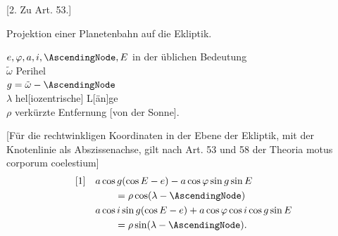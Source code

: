 \begin{center}
[2. Zu Art. 53.]
\medskip

Projektion einer Planetenbahn auf die Ekliptik.
\end{center}
\noindent \(e,\varphi,a,i,\AscendingNode,E\) in der üblichen Bedeutung\\
\(\tilde\omega\) Perihel\\
\(g=\tilde\omega-\AscendingNode\)\\
\(\lambda\) hel[iozentrische] L[än]ge\\
\(\rho\) verkürzte Entfernung [von der Sonne].

[Für die rechtwinkligen Koordinaten in der Ebene der Ekliptik, mit der Knotenlinie als Abszissenachse, gilt nach Art. 53 und 58 der Theoria motus corporum coelestium]
\[
\begin{aligned}
\text{[1]}\quad &a\cos g(\cos E-e)-a\cos\varphi\sin g\sin E\\
&\qquad=\rho\cos(\lambda-\AscendingNode)\\
&a\cos i\sin g(\cos E-e)+a\cos\varphi\cos i\cos g\sin E\\
&\qquad=\rho\sin(\lambda-\AscendingNode).
\end{aligned}
\]

